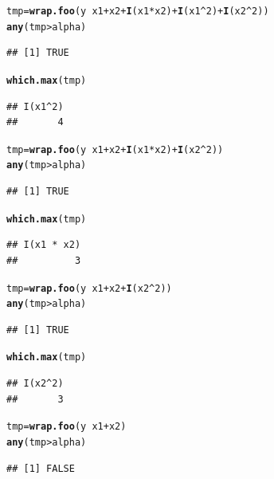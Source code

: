 \documentclass{article}\usepackage[]{graphicx}\usepackage[]{color}
\makeatletter
\newcommand{\hlnum}[1]{\textcolor[rgb]{0.686,0.059,0.569}{#1}}%
\newcommand{\hlopt}[1]{\textcolor[rgb]{0,0,0}{#1}}%
\newcommand{\hlstd}[1]{\textcolor[rgb]{0.345,0.345,0.345}{#1}}%
\newcommand{\hlkwb}[1]{\textcolor[rgb]{0.69,0.353,0.396}{#1}}%
\newcommand{\hlkwd}[1]{\textcolor[rgb]{0.737,0.353,0.396}{\textbf{#1}}}%
\newenvironment{kframe}{%
 \def\at@end@of@kframe{}%
 \ifinner\ifhmode%
  \def\at@end@of@kframe{\end{minipage}}%
  \begin{minipage}{\columnwidth}%
 \fi\fi%
 \def\FrameCommand##1{\hskip\@totalleftmargin \hskip-\fboxsep
 \colorbox{shadecolor}{##1}\hskip-\fboxsep
     \hskip-\linewidth \hskip-\@totalleftmargin \hskip\columnwidth}%
 \MakeFramed {\advance\hsize-\width
   \@totalleftmargin\z@ \linewidth\hsize
   \@setminipage}}%
 {\par\unskip\endMakeFramed%
 \at@end@of@kframe}
\newenvironment{knitrout}{}{} %
\makeatother
\begin{document}
\begin{enumerate}[(a)]
\begin{knitrout}
\begin{kframe}
\begin{alltt}
  \hlstd{tmp} \hlkwb{=} \hlkwd{wrap.foo}\hlstd{(y} \hlopt{~} \hlstd{x1} \hlopt{+} \hlstd{x2} \hlopt{+} \hlkwd{I}\hlstd{(x1}\hlopt{*}\hlstd{x2)} \hlopt{+} \hlkwd{I}\hlstd{(x1}\hlopt{^}\hlnum{2}\hlstd{)} \hlopt{+} \hlkwd{I}\hlstd{(x2}\hlopt{^}\hlnum{2}\hlstd{))}
  \hlkwd{any}\hlstd{(tmp} \hlopt{>} \hlstd{alpha)}
\end{alltt}
\begin{verbatim}
## [1] TRUE
\end{verbatim}
\begin{alltt}
  \hlkwd{which.max}\hlstd{(tmp)}
\end{alltt}
\begin{verbatim}
## I(x1^2) 
##       4
\end{verbatim}
\begin{alltt}
  \hlstd{tmp} \hlkwb{=} \hlkwd{wrap.foo}\hlstd{(y} \hlopt{~} \hlstd{x1} \hlopt{+} \hlstd{x2} \hlopt{+} \hlkwd{I}\hlstd{(x1}\hlopt{*}\hlstd{x2)} \hlopt{+} \hlkwd{I}\hlstd{(x2}\hlopt{^}\hlnum{2}\hlstd{))}
  \hlkwd{any}\hlstd{(tmp} \hlopt{>} \hlstd{alpha)}
\end{alltt}
\begin{verbatim}
## [1] TRUE
\end{verbatim}
\begin{alltt}
  \hlkwd{which.max}\hlstd{(tmp)}
\end{alltt}
\begin{verbatim}
## I(x1 * x2) 
##          3
\end{verbatim}
\begin{alltt}
  \hlstd{tmp} \hlkwb{=} \hlkwd{wrap.foo}\hlstd{(y} \hlopt{~} \hlstd{x1} \hlopt{+} \hlstd{x2} \hlopt{+} \hlkwd{I}\hlstd{(x2}\hlopt{^}\hlnum{2}\hlstd{))}
  \hlkwd{any}\hlstd{(tmp} \hlopt{>} \hlstd{alpha)}
\end{alltt}
\begin{verbatim}
## [1] TRUE
\end{verbatim}
\begin{alltt}
  \hlkwd{which.max}\hlstd{(tmp)}
\end{alltt}
\begin{verbatim}
## I(x2^2) 
##       3
\end{verbatim}
\begin{alltt}
  \hlstd{tmp} \hlkwb{=} \hlkwd{wrap.foo}\hlstd{(y} \hlopt{~} \hlstd{x1} \hlopt{+} \hlstd{x2)}
  \hlkwd{any}\hlstd{(tmp} \hlopt{>} \hlstd{alpha)}
\end{alltt}
\begin{verbatim}
## [1] FALSE
\end{verbatim}
\end{kframe}
\end{knitrout}


\end{enumerate}
\end{document}
